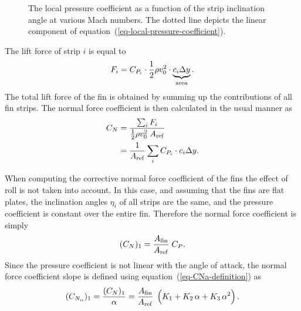 \begin{figure}
\centering
{}
\caption{The local pressure coefficient as a function of the
  strip inclination angle at various Mach numbers.  The dotted line
  depicts the linear component of
  equation~(\ref{eq-local-pressure-coefficient}).}
\label{fig-fin-strip-pressure-coefficient}
\end{figure}



The lift force of strip $i$ is equal to
%
\begin{equation}
F_i = C_{P_i} \cdot \frac{1}{2} \rho v_0^2 \cdot 
  \underbrace{c_i \Delta y}_{\rm area}.
\label{eq-supersonic-strip-lift-force}
\end{equation}
%
The total lift force of the fin is obtained by summing up the
contributions of all fin strips.  The normal force coefficient is then
calculated in the usual manner as
%
\begin{align}
C_N &= \frac{\sum_i F_i}{\frac{1}{2}\rho v_0^2\; A_{\rm ref}} \\
    &= \frac{1}{A_{\rm ref}}\sum_i C_{P_i} \cdot c_i\Delta y.
\end{align}

When computing the corrective normal force coefficient of the fins the
effect of roll is not taken into account.  In this case, and
assuming that the fins are flat plates, the inclination angles
$\eta_i$ of all strips are the same, and the pressure coefficient is
constant over the entire fin.  Therefore the normal force coefficient
is simply
%
\begin{equation}
(C_N)_1 = \frac{A_{\rm fin}}{A_{\rm ref}} \;C_P.
\end{equation}
%
Since the pressure coefficient is not linear with the angle of attack,
the normal force coefficient slope is defined using
equation~(\ref{eq-CNa-definition}) as
%
\begin{equation}
(\CNa)_1 = \frac{(C_N)_1}{\alpha} = 
 \frac{\Afin}{\Aref} \; \del{K_1 + K_2\,\alpha + K_3\,\alpha^2}.
\end{equation}




